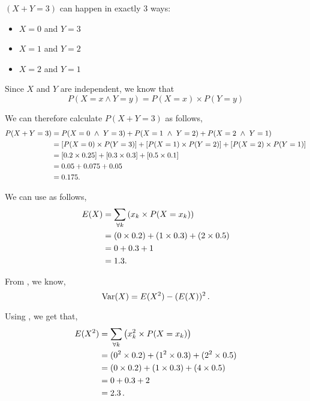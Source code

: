 \begin{subquestions}
\begin{subsubquestions}
\subsubquestion

$(X+Y=3)$ can happen in exactly 3 ways:
\begin{itemize}
	\item $X = 0$ and $Y = 3$
	\item $X = 1$ and $Y = 2$
	\item $X = 2$ and $Y = 1$
\end{itemize}

Since $X$ and $Y$ are independent, we know that
\begin{equation}
	P(X=x \land Y=y) = P(X=x) \times P(Y=y)
\end{equation}

We can therefore calculate $P(X+Y=3)$ as follows,
\begin{align}
	P(X+Y=3) & = P(X=0 ~\land~ Y=3) + P(X=1 ~\land~ Y=2) + P(X=2 ~\land~ Y=1) \nonumber \\
	         & = [P(X=0) \times P(Y=3)] + [P(X=1) \times P(Y=2)] + [P(X=2) \times P(Y=1)] \nonumber \\
	         & = [0.2 \times 0.25] + [0.3 \times 0.3] + [0.5 \times 0.1] \nonumber \\ 
	         & = 0.05 + 0.075+0.05 \nonumber \\
	         & = 0.175.
\end{align}


\subsubquestion

\begin{subsubsubquestions}
	
\subsubsubquestion

We can use  as follows,
\begin{align}
	E(X) & =  \sum_{\forall k} \left(x_k \times P(X=x_k) \right) \nonumber \\
	     & = (0 \times 0.2)+(1 \times 0.3)+(2 \times 0.5) \nonumber \\
	     & = 0 + 0.3 + 1 \nonumber \\
	     & = 1.3.
\end{align}
	
\subsubsubquestion

From , we know,
\begin{equation}
	\text{Var}(X) = E(X^2) - (E(X))^2 \,.
\end{equation}

Using , we get that,
\begin{align}
	E(X^2) & = \sum_{\forall k} \left(x^2_k \times P(X=x_k) \right)  \nonumber \\
	       & = (0^2 \times 0.2) + (1^2 \times 0.3) + (2^2 \times 0.5)  \nonumber \\
	       & = (0 \times 0.2) + (1 \times 0.3) + (4 \times 0.5)  \nonumber \\
	       & = 0 + 0.3 + 2  \nonumber \\
	       & = 2.3 \,.
\end{align}


\end{subsubsubquestions}
\end{subsubquestions}
\end{subquestions}
